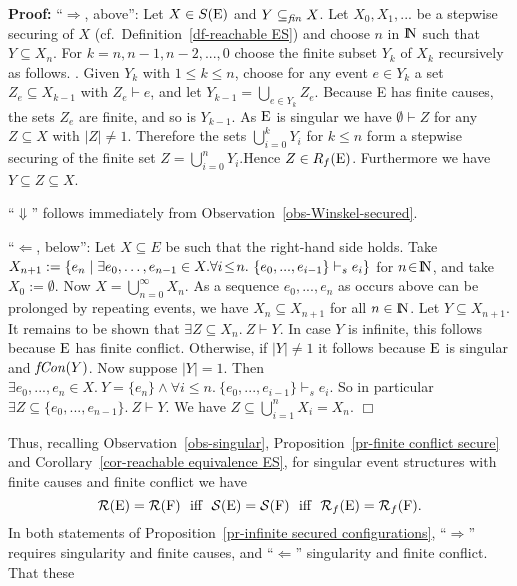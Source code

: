 \documentclass[twocolumn]{article}
\newenvironment{proof}{\begin{trivlist} \item[\hspace{\labelsep}\bf
Proof:]}{\hfill $\Box$\end{trivlist}}
\newcommand{\df}[1]{Definition~\ref{df-#1}}
\newcommand{\pr}[1]{Proposition~\ref{pr-#1}}
\newcommand{\cor}[1]{Corollary~\ref{cor-#1}}
\newcommand{\ob}[1]{Observation~\ref{obs-#1}}
\newcommand{\turn}{\vdash}                              \newcommand{\dbigcup}{\bigcup_{\uparrow}}		\newcommand{\nbigcup}{\bigcup_{\bullet}}		\newcommand{\nbigcap}{\bigcap_{\bullet}}		\newcommand{\bbigcup}{\overline{\bigcup}}		\newcommand{\bbigcap}{\overline{\bigcap}}		\newcommand{\nbbigcap}{\bbigcap_{\bullet}}		\newcommand{\fbbigcup}{\overline{\bigcup}^f}		\newcommand{\bbbigcup}{\overline{\bigcup}^2}		\newcommand{\dcup}{~~\makebox[0pt]{\LARGE$\cdot$}\makebox[0pt]{$\cup$}~~}
\newcommand{\dl}[1]{\mbox{\rm I\hspace{-0.75mm}#1}}     \newcommand{\dc}[1]{\mbox{\rm {\raisebox{.4ex}{\makebox [0pt][l]{\hspace{.2em}\scriptsize $\mid$}}}#1}}
\newcommand{\IN}{\dl{N}}                        \newcommand{\IQ}{\dc{Q}}                        \newcommand{\IC}{\dc{C}}                        \newcommand{\IE}{\dl{E}}                        \newcommand{\IG}{\dc{G}}                        \newcommand{\fC}{{\cal C}}                      \newcommand{\fE}{{\cal E}}                      \newcommand{\fG}{{\cal G}}                      \newcommand{\fN}{{\cal N}}                      \newcommand{\fF}{{\cal F}}                      \newcommand{\fL}{{\cal L}}                      \newcommand{\fM}{{\cal M}}                      \newcommand{\fS}{{\cal S}}                      \newcommand{\fR}{{\cal R}}                      \newcommand{\eC}{{\rm C}}                       \newcommand{\eD}{{\rm D}}                       \newcommand{\eE}{{\rm E}}                       \newcommand{\eF}{{\rm F}}                       \newcommand{\eG}{{\rm G}}                       \newcommand{\eH}{{\rm H}}                       \newcommand{\eK}{{\rm K}}                       \newcommand{\eL}{{\rm L}}                       \newcommand{\eN}{{\rm N}}                       \newcommand{\eP}{{\rm P}}                       \newcommand{\eM}{{\rm M}}                       \newcommand{\eT}{{\rm T}}                       \newcommand{\fT}{{\cal T}}
\begin{document}
\begin{proof}
``$\Rightarrow$, above'': Let $X \in S(\eE)$ and $Y \subseteq_{\it
fin} X$. Let $X_0,X_1,...$ be a stepwise securing of $X$
(cf.~\df{reachable ES}) and choose
$n$ in $\IN$ such that $Y \subseteq X_n$. For $k=n,n-1,n-2,...,0$
choose the finite subset $Y_k$ of $X_k$ recursively as follows.
.  Given $Y_{k}$ with $1 \leq k \leq n$, choose for any
event $e \in Y_{k}$ a set $Z_e \subseteq X_{k-1}$ with $Z_e \turn e$,
and let $Y_{k-1} = \bigcup_{e \in Y_{k}}Z_e$. 
Because E has finite causes, the sets $Z_e$ are finite, and so is
$Y_{k-1}$. As $\eE$ is singular we have
$\emptyset \turn Z$ for any $Z \subseteq X$ with $|Z| \neq 1$.
Therefore the sets $\bigcup_{i=0}^k Y_i$ for $k\leq n$ form a
stepwise securing of the finite set $Z = \bigcup_{i=0}^n Y_i$.\pagebreak[1]
Hence $Z \in R_f(\eE)$. Furthermore we have $Y \subseteq Z \subseteq X$.

``$\Downarrow$'' follows immediately from \ob{Winskel-secured}.

``$\Leftarrow$, below'': Let $X \subseteq E$ be such that the
right-hand side holds.
Take $X_{n+1} := \{e_n \mid \exists e_0, \ldots, e_{n-1} \in X.\linebreak
\forall i\!\leq\! n.~ \{e_0,...,e_{i-1}\} \turn_s e_i\}$ for $n\!\in\!\IN$,
and take $X_0 := \emptyset$. Now $X = \bigcup_{n=0}^\infty X_n$.  As a
sequence $e_0,...,e_n$ as occurs above can be prolonged by repeating
events, we have $X_n \subseteq X_{n+1}$ for all $n \in \IN$.  Let
{$Y \subseteq X_{n+1}$}. It remains to be shown that $\exists Z
\subseteq X_{n}.~ Z \turn Y$. In case $Y$ is infinite, this follows
because $\eE$ has finite conflict. Otherwise, if $|Y|\neq 1$ it
follows because $\eE$ is singular and ${\it fCon}(Y)$. Now suppose $|Y|=1$.
Then $\exists e_0,..., e_{n} \in X.~ Y\!=\!\{e_{n}\} \wedge \forall i\leq n.~
\{e_0,...,e_{i-1}\} \turn_s e_i$.
So in particular $\exists Z \subseteq \{e_0,...,e_{n-1}\}.~ Z \turn Y$.
We have $Z \subseteq \bigcup_{i=1}^n X_i = X_n$.
\end{proof}
Thus, recalling \ob{singular}, \pr{finite conflict secure} and
\cor{reachable equivalence ES}, for singular event structures with
finite causes and finite conflict we have\vspace{-3pt}
$$\fR(\eE)=\fR(\eF) ~\mbox{ iff }~ \fS(\eE)=\fS(\eF) ~\mbox{ iff }~
\fR_f(\eE)=\fR_f(\eF).\vspace{-3pt}$$
In both statements of \pr{infinite secured configurations},
``$\Rightarrow$'' requires singularity and finite causes, and
``$\Leftarrow$'' singularity and finite conflict. That these
\end{document}
